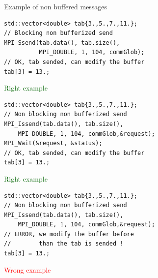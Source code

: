 \documentclass[compress,10pt,aspectratio=169]{beamer}
\begin{document}
\begin{frame}[fragile]{Example of non buffered messages}
    \begin{multicols}{2}
\begin{mdframed}[backgroundcolor=green!20]
\begin{minipage}{0.45\textwidth}
\begin{verbatim}
std::vector<double> tab{3.,5.,7.,11.};
// Blocking non bufferized send
MPI_Ssend(tab.data(), tab.size(), 
          MPI_DOUBLE, 1, 104, commGlob);
// OK, tab sended, can modify the buffer
tab[3] = 13.;
\end{verbatim}
\textcolor{DarkGreen}{\small Right example}
\end{minipage}
\end{mdframed}
\begin{mdframed}[backgroundcolor=green!20]
\begin{minipage}{0.45\textwidth}
\begin{verbatim}
std::vector<double> tab{3.,5.,7.,11.};
// Non blocking non bufferized send
MPI_Issend(tab.data(), tab.size(), 
    MPI_DOUBLE, 1, 104, commGlob,&request);
MPI_Wait(&request, &status);
// OK, tab sended, can modify the buffer
tab[3] = 13.;
\end{verbatim}
\textcolor{DarkGreen}{\small Right example}
\end{minipage}
\end{mdframed}
\columnbreak
\begin{mdframed}[backgroundcolor=red!20]
\begin{minipage}{0.45\textwidth}
\begin{verbatim}
std::vector<double> tab{3.,5.,7.,11.};
// Non blocking non bufferized send
MPI_Issend(tab.data(), tab.size(), 
    MPI_DOUBLE, 1, 104, commGlob,&request);
// ERROR, we modify the buffer before
//        than the tab is sended !
tab[3] = 13.;
\end{verbatim}
\textcolor{red}{\small Wrong example}
\end{minipage}
\end{mdframed}
\end{multicols}
\end{frame}
\end{document}

